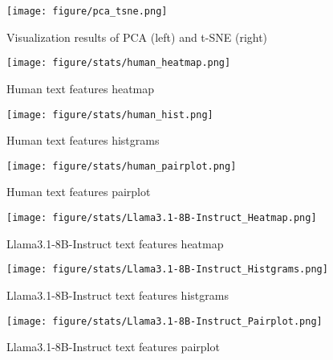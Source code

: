 \begin{figure*}[h]
    \centering
    \texttt{[image: figure/pca\_tsne.png]}
    \caption{Visualization results of PCA (left) and t-SNE (right)}
    \label{fig:pca_tsne}
\end{figure*}

\begin{figure}[H]
    \centering
    \texttt{[image: figure/stats/human\_heatmap.png]}
    \caption{Human text features heatmap}
    \label{fig:human_heatmap}
\end{figure}

\begin{figure}[H]
    \centering
    \texttt{[image: figure/stats/human\_hist.png]}
    \caption{Human text features histgrams}
    \label{fig:human_hist}
\end{figure}

\begin{figure}[H]
    \centering
    \texttt{[image: figure/stats/human\_pairplot.png]}
    \caption{Human text features pairplot}
    \label{fig:human_pairplot}
\end{figure}



\begin{figure}[H]
    \centering
    \texttt{[image: figure/stats/Llama3.1-8B-Instruct\_Heatmap.png]}
    \caption{Llama3.1-8B-Instruct text features heatmap}
    \label{fig:human_heatmap}
\end{figure}


\begin{figure}[H]
    \centering
    \texttt{[image: figure/stats/Llama3.1-8B-Instruct\_Histgrams.png]}
    \caption{Llama3.1-8B-Instruct text features histgrams}
    \label{fig:human_hist}
\end{figure}


\begin{figure}[H]
    \centering
    \texttt{[image: figure/stats/Llama3.1-8B-Instruct\_Pairplot.png]}
    \caption{Llama3.1-8B-Instruct text features pairplot}
    \label{fig:human_pairplot}
\end{figure}



